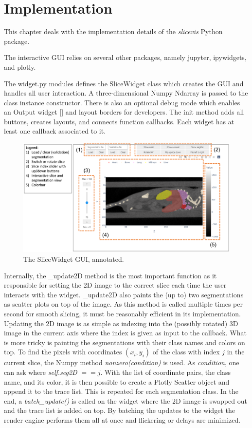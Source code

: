 \chapter{Implementation}
This chapter deals with the implementation details of the \emph{slicevis} Python package.

The interactive GUI relies on several other packages, namely jupyter, ipywidgets, and plotly.  

The widget.py modules defines the SliceWidget class which creates the GUI and handles all user interaction. A three-dimensional Numpy Ndarray is passed to the class instance constructor. There is also an optional debug mode which enables an Output widget [] and layout borders for developers. The init method adds all buttons, creates layouts, and connects function callbacks. Each widget has at least one callback associated to it.

\begin{figure}[h]
	\centering
	\includegraphics[width=.9\linewidth]{figures/GUI.png}
	\caption{The SliceWidget GUI, annotated.}
\end{figure}

Internally, the \_update2D method is the most important function as it responsible for setting the 2D image to the correct slice each time the user interacts with the widget. \_update2D also paints the (up to) two segmentations as scatter plots on top of the image. As this method is called multiple times per second for smooth slicing, it must be reasonably efficient in its implementation. Updating the 2D image is as simple as indexing into the (possibly rotated) 3D image in the current axis where the index is given as input to the callback. What is more tricky is painting the segmentations with their class names and colors on top. To find the pixels with coordinates $(x_i , y_i)$ of the class with index $j$ in the current slice, the Numpy method \emph{nonzero(condition)} is used. As \emph{condition}, one can ask where \emph{self.seg2D} $== j$. With the list of coordinate pairs, the class name, and its color, it is then possible to create a Plotly Scatter object and append it to the trace list. This is repeated for each segmentation class. In the end, a \emph{batch\_update()} is called on the widget where the 2D image is swapped out and the trace list is added on top. By batching the updates to the widget the render engine performs them all at once and flickering or delays are minimized. 

